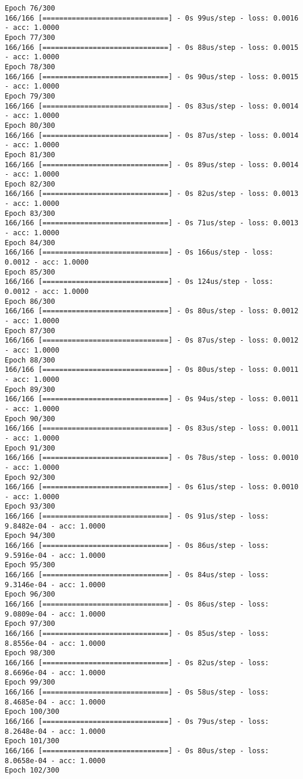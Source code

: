 \documentclass[11pt]{article}
\begin{document}
\begin{Verbatim}[commandchars=\\\{\}]
Epoch 76/300
166/166 [==============================] - 0s 99us/step - loss: 0.0016 - acc: 1.0000
Epoch 77/300
166/166 [==============================] - 0s 88us/step - loss: 0.0015 - acc: 1.0000
Epoch 78/300
166/166 [==============================] - 0s 90us/step - loss: 0.0015 - acc: 1.0000
Epoch 79/300
166/166 [==============================] - 0s 83us/step - loss: 0.0014 - acc: 1.0000
Epoch 80/300
166/166 [==============================] - 0s 87us/step - loss: 0.0014 - acc: 1.0000
Epoch 81/300
166/166 [==============================] - 0s 89us/step - loss: 0.0014 - acc: 1.0000
Epoch 82/300
166/166 [==============================] - 0s 82us/step - loss: 0.0013 - acc: 1.0000
Epoch 83/300
166/166 [==============================] - 0s 71us/step - loss: 0.0013 - acc: 1.0000
Epoch 84/300
166/166 [==============================] - 0s 166us/step - loss: 0.0012 - acc: 1.0000
Epoch 85/300
166/166 [==============================] - 0s 124us/step - loss: 0.0012 - acc: 1.0000
Epoch 86/300
166/166 [==============================] - 0s 80us/step - loss: 0.0012 - acc: 1.0000
Epoch 87/300
166/166 [==============================] - 0s 87us/step - loss: 0.0012 - acc: 1.0000
Epoch 88/300
166/166 [==============================] - 0s 80us/step - loss: 0.0011 - acc: 1.0000
Epoch 89/300
166/166 [==============================] - 0s 94us/step - loss: 0.0011 - acc: 1.0000
Epoch 90/300
166/166 [==============================] - 0s 83us/step - loss: 0.0011 - acc: 1.0000
Epoch 91/300
166/166 [==============================] - 0s 78us/step - loss: 0.0010 - acc: 1.0000
Epoch 92/300
166/166 [==============================] - 0s 61us/step - loss: 0.0010 - acc: 1.0000
Epoch 93/300
166/166 [==============================] - 0s 91us/step - loss: 9.8482e-04 - acc: 1.0000
Epoch 94/300
166/166 [==============================] - 0s 86us/step - loss: 9.5916e-04 - acc: 1.0000
Epoch 95/300
166/166 [==============================] - 0s 84us/step - loss: 9.3146e-04 - acc: 1.0000
Epoch 96/300
166/166 [==============================] - 0s 86us/step - loss: 9.0809e-04 - acc: 1.0000
Epoch 97/300
166/166 [==============================] - 0s 85us/step - loss: 8.8556e-04 - acc: 1.0000
Epoch 98/300
166/166 [==============================] - 0s 82us/step - loss: 8.6696e-04 - acc: 1.0000
Epoch 99/300
166/166 [==============================] - 0s 58us/step - loss: 8.4685e-04 - acc: 1.0000
Epoch 100/300
166/166 [==============================] - 0s 79us/step - loss: 8.2648e-04 - acc: 1.0000
Epoch 101/300
166/166 [==============================] - 0s 80us/step - loss: 8.0658e-04 - acc: 1.0000
Epoch 102/300

\end{Verbatim}
\end{document}
